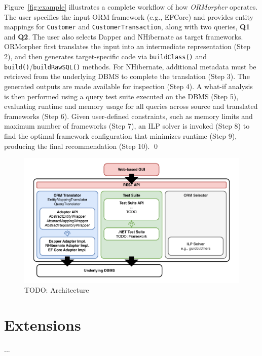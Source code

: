 \begin{example}    
\small
Figure~\ref{fig:example} illustrates a complete workflow of how \emph{ORMorpher} operates. The user specifies the input ORM framework (e.g., EFCore) and provides entity mappings for \texttt{Customer} and \texttt{CustomerTransaction}, along with two queries, \textbf{Q1} and \textbf{Q2}. The user also selects Dapper and NHibernate as target frameworks. ORMorpher first translates the input into an intermediate representation (Step 2), and then generates target-specific code via \texttt{buildClass()} and \texttt{build()}/\texttt{buildRawSQL()} methods. For NHibernate, additional metadata must be retrieved from the underlying DBMS to complete the translation (Step 3). The generated outputs are made available for inspection (Step 4). A what-if analysis is then performed using a query test suite executed on the DBMS (Step 5), evaluating runtime and memory usage for all queries across source and translated frameworks (Step 6). Given user-defined constraints, such as memory limits and maximum number of frameworks (Step 7), an ILP solver is invoked (Step 8) to find the optimal framework configuration that minimizes runtime (Step 9), producing the final recommendation (Step 10).
\qed
\end{example}


\begin{figure}
\centering
\includegraphics[scale=0.8]{thesis/img/thesis/ORM-architecture.pdf}
\caption{TODO: Architecture}
\label{fig:architecture}
\end{figure}

\section{Extensions}

...